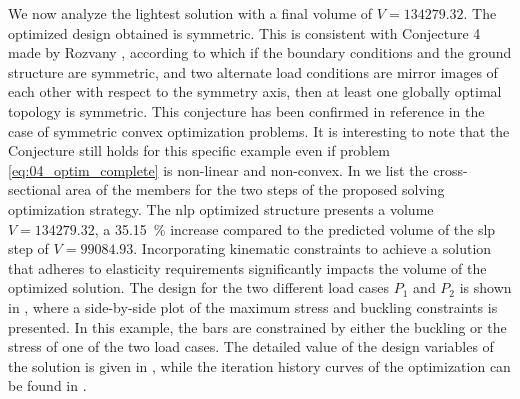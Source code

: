 We now analyze the lightest solution with a final volume of $V=134279.32$. The optimized design obtained is symmetric. This is consistent with Conjecture 4 made by Rozvany , according to which if the boundary conditions and the ground structure are symmetric, and two alternate load conditions are mirror images of each other with respect to the symmetry axis, then at least one globally optimal topology is symmetric. This conjecture has been confirmed in reference  in the case of symmetric convex optimization problems. It is interesting to note that the Conjecture still holds for this specific example even if problem \ref{eq:04_optim_complete} is non-linear and non-convex. In  we list the cross-sectional area of the members for the two steps of the proposed solving optimization strategy. The \gls{nlp} optimized structure presents a volume $V=134279.32$, a \qty{35.15}{\%} increase compared to the predicted volume of the \gls{slp} step of $V=99084.93$. Incorporating kinematic constraints to achieve a solution that adheres to elasticity requirements significantly impacts the volume of the optimized solution. The design for the two different load cases $P_1$ and $P_2$ is shown in , where a side-by-side plot of the maximum stress and buckling constraints is presented. In this example, the bars are constrained by either the buckling or the stress of one of the two load cases. The detailed value of the design variables of the solution is given in , while the iteration history curves of the optimization can be found in .

